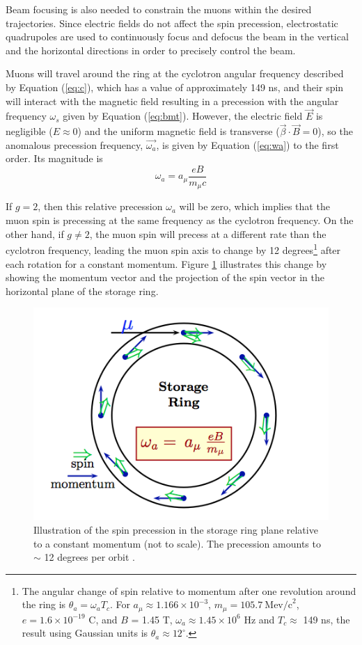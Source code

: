 \documentclass{outhesis}
\begin{document}
Beam focusing is also needed to constrain the muons within the desired trajectories. Since electric fields do not affect the spin precession, electrostatic quadrupoles are used to continuously focus and defocus the beam in the vertical and the horizontal directions in order to precisely control the beam. 

Muons will travel around the ring at the cyclotron angular frequency described by Equation (\ref{eq:c}), which has a value of approximately 149 ns, and their spin will interact with the magnetic field resulting in a precession with the angular frequency $\omega_s$ given by Equation (\ref{eq:bmt}). However, the electric field $\overrightarrow{E}$ is negligible ($E \approx 0$) and the uniform magnetic field is transverse ($\overrightarrow{\beta} \cdot \overrightarrow{B} = 0$), so the anomalous precession frequency, $\overrightarrow{\omega_a}$, is given by Equation (\ref{eq:wa}) to the first order. Its magnitude is  
\begin{equation}
\omega_a =   a_{\mu}\frac{eB}{m_{\mu}c} 
\label{eq:waa}
\end{equation}

If $g = 2$, then this relative precession $\omega_a$ will be zero, which implies that the muon spin is precessing at the same frequency as the cyclotron frequency. On the other hand, if $g \neq 2$, the muon spin will precess at a different rate than the cyclotron frequency, leading the muon spin axis to change by 12 degrees\footnote{The angular change of spin relative to momentum after one revolution around the ring is $\theta_a = \omega_a T_c$. For $a_{\mu} \approx 1.166\times10^{-3}$, $m_{\mu} = 105.7~\text{Mev/c}^2$, $e = 1.6\times10^{-19}$ C, and $B$ = 1.45 T, $\omega_a \approx 1.45 \times 10^{6}$ Hz and $T_c \approx$ 149 ns, the result using Gaussian units is $\theta_a \approx 12^\circ$.} after each rotation for a constant momentum. Figure \ref{fig:ring} illustrates this change by showing the momentum vector and the projection of the spin vector in the horizontal plane of the storage ring. 
\begin{figure}
  \centering
  \includegraphics[scale=0.5]{figures/ring}
  \caption[Muon spin precession in the storage ring]{Illustration of the spin precession in the storage ring plane relative to a constant momentum (not to scale). The precession amounts to $\sim$ 12 degrees per orbit \cite{phen}.}
  \label{fig:ring}
\end{figure}
 
\end{document}
